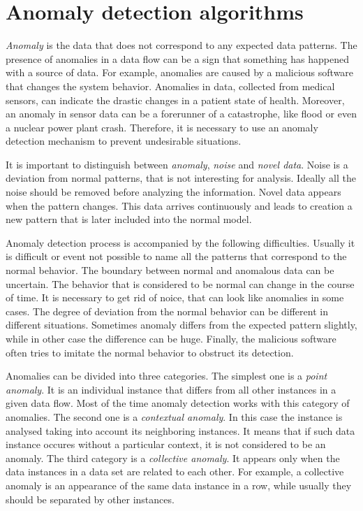 \section{Anomaly detection algorithms}

\textit{Anomaly} is the data that does not correspond to any expected data patterns.
The presence of anomalies in a data flow can be a sign that something has happened with a source of data.
For example, anomalies are caused by a malicious software that changes the system behavior. 
Anomalies in data, collected from medical sensors, can indicate the drastic changes in a patient state of health.
Moreover, an anomaly in sensor data can be a forerunner of a catastrophe, like flood or even a nuclear power plant crash.
Therefore, it is necessary to use an anomaly detection mechanism to prevent undesirable situations.

It is important to distinguish between \textit{anomaly}, \textit{noise} and \textit{novel data}.
Noise is a deviation from normal patterns, that is not interesting for analysis.
Ideally all the noise should be removed before analyzing the information.
Novel data appears when the pattern changes.
This data arrives continuously and leads to creation a new pattern that is later included into the normal model.  

Anomaly detection process is accompanied by the following difficulties.
Usually it is difficult or event not possible to name all the patterns that correspond to the normal behavior.
The boundary between normal and anomalous data can be uncertain.
The behavior that is considered to be normal can change in the course of time.
It is necessary to get rid of noice, that can look like anomalies in some cases.
The degree of deviation from the normal behavior can be different in different situations.
Sometimes anomaly differs from the expected pattern slightly, while in other case the difference can be huge.
Finally, the malicious software often tries to imitate the normal behavior to obstruct its detection. 

Anomalies can be divided into three categories.
The simplest one is a \textit{point anomaly}.
It is an individual instance that differs from all other instances in a given data flow.
Most of the time anomaly detection works with this category of anomalies.
The second one is a \textit{contextual anomaly}.
In this case the instance is analysed taking into account its neighboring instances.
It means that if such data instance occures without a particular context, it is not considered to be an anomaly.
The third category is a \textit{collective anomaly}.
It appears only when the data instances in a data set are related to each other.
For example, a collective anomaly is an appearance of the same data instance in a row, while usually they should be separated by other instances.

